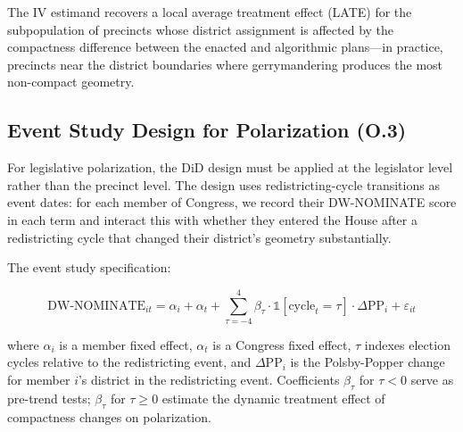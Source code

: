 The IV estimand recovers a local average treatment effect (LATE) for the subpopulation
of precincts whose district assignment is affected by the compactness difference between
the enacted and algorithmic plans---in practice, precincts near the district boundaries
where gerrymandering produces the most non-compact geometry.

\subsection{Event Study Design for Polarization (O.3)}

For legislative polarization, the DiD design must be applied at the legislator level
rather than the precinct level. The design uses redistricting-cycle transitions as
event dates: for each member of Congress, we record their DW-NOMINATE score in each
term and interact this with whether they entered the House after a redistricting cycle
that changed their district's geometry substantially.

The event study specification:

\begin{equation}
\text{DW-NOMINATE}_{it} = \alpha_i + \alpha_t
  + \sum_{\tau=-4}^{4} \beta_\tau \cdot \mathbb{1}[\text{cycle}_t = \tau] \cdot \Delta\text{PP}_i
  + \varepsilon_{it}
\end{equation}

where $\alpha_i$ is a member fixed effect, $\alpha_t$ is a Congress fixed effect,
$\tau$ indexes election cycles relative to the redistricting event, and $\Delta\text{PP}_i$
is the Polsby-Popper change for member $i$'s district in the redistricting event.
Coefficients $\beta_\tau$ for $\tau < 0$ serve as pre-trend tests; $\beta_\tau$ for
$\tau \geq 0$ estimate the dynamic treatment effect of compactness changes on polarization.
